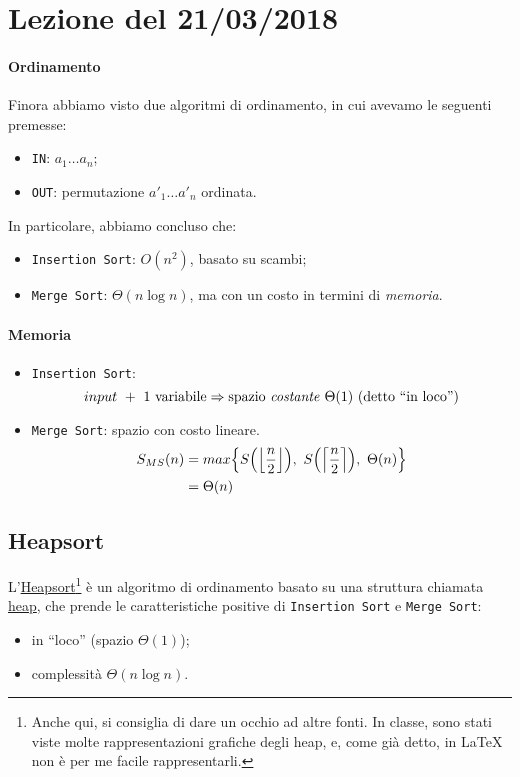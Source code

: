 \section{Lezione del 21/03/2018}
\paragraph{Ordinamento} Finora abbiamo visto due algoritmi di ordinamento, in cui avevamo le seguenti 
premesse:
\begin{itemize}
	\item[] \texttt{IN}: $a_1\dots a_n$;
	\item[] \texttt{OUT}: permutazione $a'_1\dots a'_n$ ordinata.
\end{itemize}
In particolare, abbiamo concluso che:
\begin{itemize}
	\item \texttt{Insertion Sort}: $O(n^2)$, basato su scambi;
	\item \texttt{Merge Sort}: $\Theta(n \log n)$, ma con un costo in termini di \emph{memoria}.
\end{itemize}

\paragraph{Memoria} 
\begin{itemize}
	\item \texttt{Insertion Sort}: 
	$$input \ + \ 1 \text{ variabile} \Rightarrow 
		\text{spazio \emph{costante} } \Theta (1) \text{ (detto ``in loco'')}$$
	\item \texttt{Merge Sort}: spazio con costo lineare.
	\begin{align*}
		S_{MS}(n) & = max\Big{\{} S\Big( \Big{\lfloor}{\frac{n}{2}}\Big{\rfloor} \Big), 
		\ S\Big( \Big{\lceil}{\frac{n}{2}}\Big{\rceil} \Big), \ \Theta (n) \Big{\}} \\
		& = \Theta (n)
	\end{align*}
\end{itemize}

\subsection{Heapsort}
L'\href{https://en.wikipedia.org/wiki/Heapsort}{Heapsort}\footnote{Anche qui, si consiglia di dare %
un occhio ad altre fonti. In classe, sono stati viste molte rappresentazioni grafiche degli heap, %
e, come già detto, in \LaTeX $\ $non è per me facile rappresentarli.} è un algoritmo di ordinamento 
basato su 
una struttura chiamata \href{https://en.wikipedia.org/wiki/Heap_(data_structure)}{heap}, che prende le caratteristiche positive di 
\texttt{Insertion Sort} e \texttt{Merge Sort}:
\begin{itemize}[noitemsep]
	\item in ``loco'' (spazio $\Theta (1)$);
	\item complessità $\Theta(n \log n)$.
\end{itemize}

